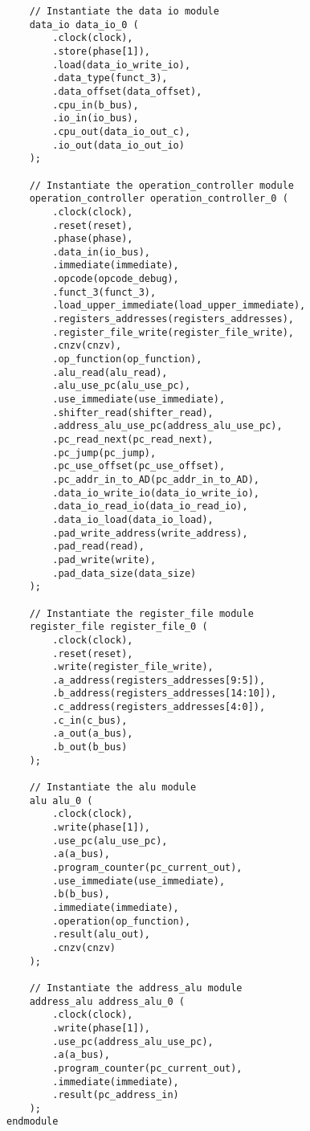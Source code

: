 \begin{lstlisting}
    // Instantiate the data io module
    data_io data_io_0 (
        .clock(clock),
        .store(phase[1]),
        .load(data_io_write_io),
        .data_type(funct_3),
        .data_offset(data_offset),
        .cpu_in(b_bus),
        .io_in(io_bus),
        .cpu_out(data_io_out_c),
        .io_out(data_io_out_io)
    );

    // Instantiate the operation_controller module
    operation_controller operation_controller_0 (
        .clock(clock),
        .reset(reset),
        .phase(phase),
        .data_in(io_bus),
        .immediate(immediate),
        .opcode(opcode_debug),
        .funct_3(funct_3),
        .load_upper_immediate(load_upper_immediate),
        .registers_addresses(registers_addresses),
        .register_file_write(register_file_write),
        .cnzv(cnzv),
        .op_function(op_function),
        .alu_read(alu_read),
        .alu_use_pc(alu_use_pc),
        .use_immediate(use_immediate),
        .shifter_read(shifter_read),
        .address_alu_use_pc(address_alu_use_pc),
        .pc_read_next(pc_read_next),
        .pc_jump(pc_jump),
        .pc_use_offset(pc_use_offset),
        .pc_addr_in_to_AD(pc_addr_in_to_AD),
        .data_io_write_io(data_io_write_io),
        .data_io_read_io(data_io_read_io),
        .data_io_load(data_io_load),
        .pad_write_address(write_address),
        .pad_read(read),
        .pad_write(write),
        .pad_data_size(data_size)
    );

    // Instantiate the register_file module
    register_file register_file_0 (
        .clock(clock),
        .reset(reset),
        .write(register_file_write),
        .a_address(registers_addresses[9:5]),
        .b_address(registers_addresses[14:10]),
        .c_address(registers_addresses[4:0]),
        .c_in(c_bus),
        .a_out(a_bus),
        .b_out(b_bus)
    );

    // Instantiate the alu module
    alu alu_0 (
        .clock(clock),
        .write(phase[1]),
        .use_pc(alu_use_pc),
        .a(a_bus),
        .program_counter(pc_current_out),
        .use_immediate(use_immediate),
        .b(b_bus),
        .immediate(immediate),
        .operation(op_function),
        .result(alu_out),
        .cnzv(cnzv)
    );

    // Instantiate the address_alu module
    address_alu address_alu_0 (
        .clock(clock),
        .write(phase[1]),
        .use_pc(address_alu_use_pc),
        .a(a_bus),
        .program_counter(pc_current_out),
        .immediate(immediate),
        .result(pc_address_in)
    );
endmodule


\end{lstlisting}
